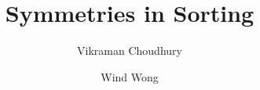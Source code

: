 \documentclass[a4paper,UKenglish,cleveref,thm-restate]{lipics-v2021}
\title{Symmetries in Sorting}
\author%
{Vikraman Choudhury}%
{University of Strathclyde, Glasgow, United Kingdom \and Universit\`{a} di Bologna, Bologna, Italy}%
{vikraman.choudhury@strath.ac.uk}%
{https://orcid.org/0000-0003-2030-8056}%
{Supported by the
 \href{https://cordis.europa.eu/programme/id/HORIZON.1.2/en}{EU Marie-Sk\l{}odowska-Curie}
 action ``ReGraDe-CS'', grant~\textnumero~\href{https://doi.org/10.3030/101106046}{101106046}.}
\author%
{Wind Wong}%
{Vrije Universiteit Amsterdam, Netherlands}%
{t.f.w.wong@vu.nl}%
{https://orcid.org/0009-0005-8306-7968}%
{Supported by the European Research Council Starting Grant for the project
``SecuStack'', funded under the European Union's
\href{https://cordis.europa.eu/programme/id/HORIZON}{Horizon Europe}
grant~\textnumero~\href{https://cordis.europa.eu/project/id/101115046}{101115046}.}
\begin{document}
\maketitle

\begin{abstract}
  
\end{abstract}



\renewcommand{\appendixsectionformat}[2]{
  {Supplementary material for Section~#1 (#2)}
}


\appendix
\end{document}
